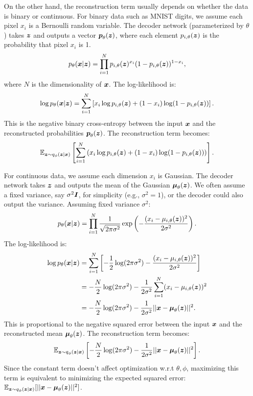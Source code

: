 On the other hand, the reconstruction term usually depends on whether the data
is binary or continuous. For binary data such as MNIST digits, we assume each
pixel $x_i$ is a Bernoulli random variable. The decoder network (parameterized
by $\theta$) takes $\boldsymbol{z}$ and outputs a vector $\boldsymbol{p}_{\theta}(\boldsymbol{z})$,
where each element $p_{i, \theta}(\boldsymbol{z})$ is the probability that pixel $x_i$ is
1.
\begin{align} \label{eq:pzbernoulli}
    p_{\theta}(\boldsymbol{x}|\boldsymbol{z}) = \prod_{i=1}^{N} p_{i, \theta}(\boldsymbol{z})^{x_i} (1 - p_{i, \theta}(\boldsymbol{z}))^{1-x_i},
\end{align}
where $N$ is the dimensionality of $\boldsymbol{x}$.
The log-likelihood is:
\begin{align}
    \log p_{\theta}(\boldsymbol{x}|\boldsymbol{z}) = \sum_{i=1}^{N} \left[ x_i \log p_{i, \theta}(\boldsymbol{z}) + (1 - x_i) \log(1 - p_{i, \theta}(\boldsymbol{z})) \right].
\end{align}
This is the negative binary cross-entropy between the input $\boldsymbol{x}$ and the reconstructed probabilities $\boldsymbol{p}_{\theta}(\boldsymbol{z})$. The reconstruction term becomes:
\begin{align}
    \mathbb{E}_{\boldsymbol{z} \sim q_{\phi}(\boldsymbol{z}|\boldsymbol{x})} \left[ \sum_{i=1}^{N} \left( x_i \log p_{i, \theta}(\boldsymbol{z}) + (1 - x_i) \log(1 - p_{i, \theta}(\boldsymbol{z})) \right) \right].
\end{align}

For continuous data, we assume each dimension $x_i$ is Gaussian. The decoder
network takes $\boldsymbol{z}$ and outputs the mean of the Gaussian $\boldsymbol{\mu}_{\theta}(\boldsymbol{z})$.
We often assume a fixed variance, say $\sigma^2 \boldsymbol{I}$, for simplicity (e.g.,
$\sigma^2=1$), or the decoder could also output the variance. Assuming fixed
variance $\sigma^2$:
\begin{align}
    p_{\theta}(\boldsymbol{x}|\boldsymbol{z}) = \prod_{i=1}^{N} \frac{1}{\sqrt{2\pi \sigma^2}} \exp\left(-\frac{(x_i - \mu_{i, \theta}(\boldsymbol{z}))^2}{2 \sigma^2}\right).
\end{align}
The log-likelihood is:
\begin{align} \label{eq:pzcontinuous}
    \log p_{\theta}(\boldsymbol{x}|\boldsymbol{z}) & = \sum_{i=1}^{N} \left[ -\frac{1}{2} \log(2\pi \sigma^2) - \frac{(x_i - \mu_{i, \theta}(\boldsymbol{z}))^2}{2 \sigma^2} \right] \\
                             & = -\frac{N}{2} \log(2\pi \sigma^2) - \frac{1}{2\sigma^2} \sum_{i=1}^{N} (x_i - \mu_{i, \theta}(\boldsymbol{z}))^2               \\
                             & = -\frac{N}{2} \log(2\pi \sigma^2) - \frac{1}{2\sigma^2} ||\boldsymbol{x} - \boldsymbol{\mu}_{\theta}(\boldsymbol{z})||^2.
\end{align}
This is proportional to the negative squared error between the input $\boldsymbol{x}$ and the reconstructed mean $\boldsymbol{\mu}_{\theta}(\boldsymbol{z})$. The reconstruction term becomes:
\begin{align}
    \mathbb{E}_{\boldsymbol{z} \sim q_{\phi}(\boldsymbol{z}|\boldsymbol{x})} \left[ -\frac{N}{2} \log(2\pi \sigma^2) - \frac{1}{2\sigma^2} ||\boldsymbol{x} - \boldsymbol{\mu}_{\theta}(\boldsymbol{z})||^2 \right].
\end{align}
Since the constant term doesn't affect optimization w.r.t $\theta, \phi$, maximizing this term is equivalent to minimizing the expected squared error: $\mathbb{E}_{\boldsymbol{z} \sim q_{\phi}(\boldsymbol{z}|\boldsymbol{x})} [||\boldsymbol{x} - \boldsymbol{\mu}_{\theta}(\boldsymbol{z})||^2]$.

